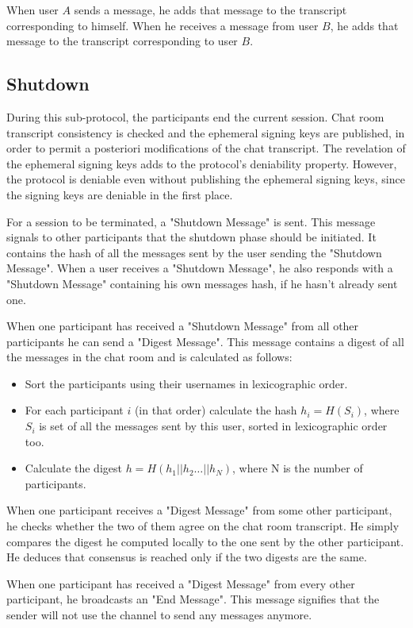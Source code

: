 When user $A$ sends a message, he adds that message to the transcript corresponding to himself.
When he receives a message from user $B$, he adds that message to the transcript corresponding to user $B$.

\subsection{Shutdown}
\label{subsections:shutdown}
During this sub-protocol, the participants end the current session. Chat room transcript consistency is checked and the ephemeral signing keys are published, in order to permit a posteriori modifications of the chat transcript. The revelation of the ephemeral signing keys adds to the protocol's deniability property. However, the protocol is deniable even without publishing the ephemeral signing keys, since the signing keys are deniable in the first place.

For a session to be terminated, a "Shutdown Message" is sent. This message signals to other participants that the shutdown phase should be initiated. It contains the  hash of all the messages sent by the user sending the "Shutdown Message". When a user receives a "Shutdown Message", he also responds with a "Shutdown Message" containing his own messages hash, if he hasn't already sent one.

When one participant has received a "Shutdown Message" from all other participants he can send a "Digest Message". This message contains a digest of all the messages in the chat room and is calculated as follows:
\begin{itemize}
  \item[] Sort the participants using their usernames in lexicographic order.
  \item[] For each participant $i$ (in that order) calculate the hash $h_i = H(S_i)$, where $S_i$ is set of all the messages sent by this user, sorted in lexicographic order too.
  \item[] Calculate the digest $h = H(h_1 || h_2 \dots || h_N)$, where N is the number of participants.
\end{itemize}

When one participant receives a "Digest Message" from some other participant, he checks whether the two of them agree on the chat room transcript. He simply compares the digest he computed locally to the one sent by the other participant. He deduces that consensus is reached only if the two digests are the same.

When one participant has received a "Digest Message" from every other participant, he broadcasts an "End Message". This message signifies that the sender will not use the channel to send any messages anymore.

